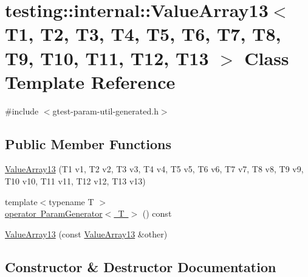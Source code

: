 \hypertarget{classtesting_1_1internal_1_1ValueArray13}{}\section{testing\+::internal\+::Value\+Array13$<$ T1, T2, T3, T4, T5, T6, T7, T8, T9, T10, T11, T12, T13 $>$ Class Template Reference}
\label{classtesting_1_1internal_1_1ValueArray13}


{\ttfamily \#include $<$gtest-\/param-\/util-\/generated.\+h$>$}

\subsection*{Public Member Functions}
\begin{DoxyCompactItemize}
\item 
\mbox{\hyperlink{classtesting_1_1internal_1_1ValueArray13_a57505ac7a4fbb86f4121bf1d41b0352d}{Value\+Array13}} (T1 v1, T2 v2, T3 v3, T4 v4, T5 v5, T6 v6, T7 v7, T8 v8, T9 v9, T10 v10, T11 v11, T12 v12, T13 v13)
\item 
{\footnotesize template$<$typename T $>$ }\\\mbox{\hyperlink{classtesting_1_1internal_1_1ValueArray13_a80572fc9c66a20824ae0934785b41f24}{operator Param\+Generator$<$ T $>$}} () const
\item 
\mbox{\hyperlink{classtesting_1_1internal_1_1ValueArray13_a150575c5629d3a589bf2baba0371b1da}{Value\+Array13}} (const \mbox{\hyperlink{classtesting_1_1internal_1_1ValueArray13}{Value\+Array13}} \&other)
\end{DoxyCompactItemize}


\subsection{Constructor \& Destructor Documentation}
\mbox{\label{classtesting_1_1internal_1_1ValueArray13_a57505ac7a4fbb86f4121bf1d41b0352d}} 
